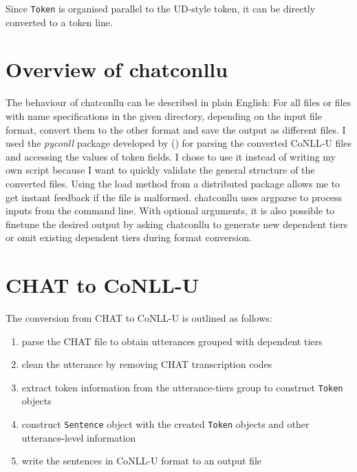 Since \texttt{Token} is organised parallel to the UD-style token, it can be directly converted to a token line.

\section{Overview of chatconllu}


The behaviour of chatconllu can be described in plain English: For all files or files with name specifications in the given directory, depending on the input file format, convert them to the other format and save the output as different files. I used the \emph{pyconll} package developed by (\cite{pyconll}) for parsing the converted CoNLL-U files and accessing the values of token fields. I chose to use it instead of writing my own script because I want to quickly validate the general structure of the converted files. Using the load method from a distributed package allows me to get instant feedback if the file is malformed. chatconllu uses argparse to process inputs from the command line. With optional arguments, it is also possible to finetune the desired output by asking chatconllu to generate new dependent tiers or omit existing dependent tiers during format conversion.


\section{CHAT to CoNLL-U}

The conversion from CHAT to CoNLL-U is outlined as follows:
\begin{enumerate}
	\item parse the CHAT file to obtain utterances grouped with dependent tiers
	\item clean the utterance by removing CHAT transcription codes
	\item extract token information from the utterance-tiers group to construct \texttt{Token} objects
	\item construct \texttt{Sentence} object with the created \texttt{Token} objects and other utterance-level information
	\item write the sentences in CoNLL-U format to an output file
\end{enumerate}

